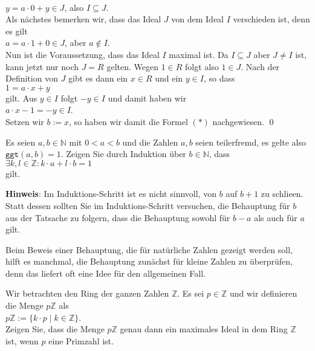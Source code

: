 \\[0.2cm]
\hspace*{1.3cm}
$y = a \cdot 0 + y \in J$, \quad also $I \subseteq J$.
\\[0.2cm]
Als n\"{a}chstes bemerken wir, dass das Ideal $J$ von dem Ideal $I$ verschieden ist, denn es gilt
\\[0.2cm]
\hspace*{1.3cm}
$a = a \cdot 1 + 0 \in J$, \quad aber \quad $a \not\in I$.
\\[0.2cm]
Nun ist die Voraussetzung, dass das Ideal $I$ maximal ist.  Da $I \subseteq J$ aber $J \not= I$  ist,
kann jetzt nur noch $J = R$ gelten.  Wegen $1 \in R$ folgt also $1 \in J$.  Nach der Definition von $J$ gibt es dann
ein $x \in R$ und ein $y \in I$, so dass
\\[0.2cm]
\hspace*{1.3cm}
$1 = a \cdot x + y$
\\[0.2cm]
gilt.  Aus  $y \in I$ folgt $-y \in I$ und damit haben wir
\\[0.2cm]
\hspace*{1.3cm}
$a \cdot x - 1 = -y \in I$.
\\[0.2cm]
Setzen wir $b := x$, so haben wir damit die Formel $(*)$ nachgewiesen. \qed


\exercise
Es seien $a,b \in \mathbb{N}$ mit $0 < a < b$ und die Zahlen $a, b$ seien teilerfremd, es gelte also
$\mathtt{ggt}(a,b) = 1$.  Zeigen Sie durch Induktion \"{u}ber $b \in \mathbb{N}$, dass 
\\[0.2cm]
\hspace*{1.3cm}
$\exists k,l \in \mathbb{Z}: k \cdot a + l \cdot b = 1$
\\[0.2cm]
gilt.  
\vspace*{0.2cm}

\noindent
\textbf{Hinweis}: Im Induktions-Schritt ist es nicht sinnvoll, von $b$ auf $b+1$ zu schlie\3en.  Statt dessen
sollten Sie im Induktions-Schritt versuchen, die Behauptung f\"{u}r $b$ aus der Tatsache zu folgern,
dass die Behauptung sowohl f\"{u}r $b-a$ als auch f\"{u}r $a$ gilt. \exend

\remark
Beim Beweis einer Behauptung, die f\"{u}r nat\"{u}rliche Zahlen gezeigt werden soll, hilft es manchmal, die
Behauptung zun\"{a}chst f\"{u}r kleine Zahlen zu \"{u}berpr\"{u}fen, denn das liefert oft eine Idee f\"{u}r den allgemeinen
Fall. 
\eox

\exercise
Wir betrachten den Ring der ganzen Zahlen $\mathbb{Z}$.  Es sei $p \in \mathbb{Z}$ und wir
definieren die Menge $p\mathbb{Z}$ als
\\[0.2cm]
\hspace*{1.3cm}
$p\mathbb{Z} := \{ k \cdot p \mid k \in \mathbb{Z} \}$.
\\[0.2cm]
Zeigen Sie, dass die Menge $p\mathbb{Z}$ genau dann ein maximales Ideal in dem Ring $\mathbb{Z}$
ist, wenn $p$ eine Primzahl ist.
\vspace*{0.2cm}

